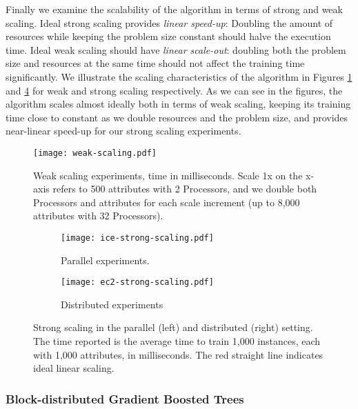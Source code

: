 Finally we examine the scalability of the algorithm in terms of strong and weak scaling.
Ideal strong scaling provides \emph{linear speed-up}: Doubling the amount of resources
while keeping the problem size constant should halve the execution time.
Ideal weak scaling should have \emph{linear scale-out}: doubling both the problem size
and resources at the same time should not affect the training time significantly.
We illustrate the scaling characteristics of the algorithm in Figures
\ref{fig:weak-scaling} and \ref{fig:strong-scaling} for weak and strong
scaling respectively. As we can see in the figures, the algorithm scales
almost ideally both in terms of weak scaling, keeping its training time
close to constant as we double resources and the problem size, and provides
near-linear speed-up for our strong scaling experiments.

\begin{figure}
	\centering
	\texttt{[image: weak-scaling.pdf]}
	\caption{Weak scaling experiments, time in milliseconds. Scale 1x on the x-axis refers to 500 attributes with 2 Processors, and we double both Processors and attributes for each scale increment (up to 8,000 attributes with 32 Processors).}
	\label{fig:weak-scaling}
\end{figure}

\begin{figure}
	\centering
	\begin{subfigure}[t]{0.5\textwidth}
		\centering
		\texttt{[image: ice-strong-scaling.pdf]}
		\caption{Parallel experiments.}
		\label{fig:strong-parallel}
	\end{subfigure}%
	\begin{subfigure}[t]{0.5\textwidth}
		\centering
		\texttt{[image: ec2-strong-scaling.pdf]}
		\caption{Distributed experiments}
		\label{fig:strong-distributed}
	\end{subfigure}
	\caption{Strong scaling in the parallel (left) and distributed (right) setting. The
		time reported is the average time to train 1,000 instances, each with 1,000 attributes, in milliseconds. The red straight line indicates ideal linear scaling.}
	\label{fig:strong-scaling}
\end{figure}

\subsubsection*{Block-distributed Gradient Boosted Trees}
\label{sec:block-gbt-results}

